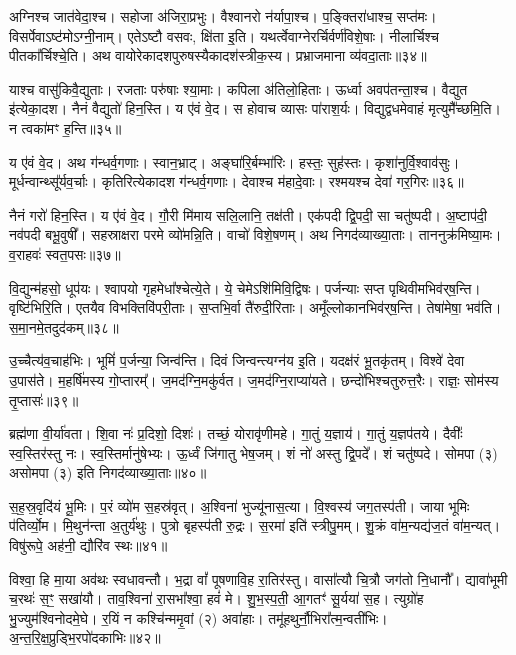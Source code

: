 अग्निश्च जात॑वेदा॒श्च। सहोजा अ॑जिरा॒प्रभुः। वैश्वानरो न॑र्यापा॒श्च। 
प॒ङ्क्तिरा॑धाश्च॒ सप्त॑मः। विसर्पेवाऽष्ट॑मोऽग्नी॒नाम्। 
एतेऽष्टौ वसवः, क्षि॑ता इ॒ति। यथर्त्वेवाग्नेरर्चिर्वर्ण॑विशे॒षाः। 
नीलार्चिश्च पीतका᳚र्चिश्चे॒ति। अथ वायोरेकादशपुरुषस्यैका\-दश॑स्त्रीक॒स्य। 
प्रभ्राजमाना व्य॑वदा॒ताः॥३४॥


याश्च वासु॑किवै॒द्युताः। रजताः परु॑षाः श्या॒माः। कपिला अ॑तिलो॒हिताः। 
ऊर्ध्वा अवप॑तन्ता॒श्च। वैद्युत इ॑त्येका॒दश। नैनं वैद्युतो॑ हिन॒स्ति। 
य ए॑वं वे॒द। स होवाच व्यासः पा॑राश॒र्यः। 
विद्युद्वधमेवाहं मृत्युमै᳚च्छमि॒ति। न त्वका॑मꣳ ह॒न्ति॥३५॥


य ए॑वं वे॒द। अथ ग॑न्धर्व॒गणाः। स्वान॒भ्राट्। 
अङ्घा॑रि॒र्बम्भा॑रिः। हस्तः॒ सुह॑स्तः। कृशा॑नुर्वि॒श्वाव॑सुः। 
मूर्धन्वान्थ्सू᳚र्यव॒र्चाः। कृतिरित्येकादश ग॑न्धर्व॒गणाः। 
देवाश्च म॑हादे॒वाः। रश्मयश्च देवा॑ गर॒गिरः॥३६॥


नैनं गरो॑ हिन॒स्ति। य ए॑वं वे॒द। 
गौ॒री मि॑माय सलि॒लानि॒ तक्ष॑ती। एक॑पदी द्वि॒पदी॒ सा चतु॑ष्पदी। 
अ॒ष्टाप॑दी॒ नव॑पदी बभू॒वुषी᳚। सहस्राक्षरा परमे व्यो॑मन्नि॒ति। 
वाचो॑ विशे॒षणम्। अथ निगद॑व्याख्या॒ताः। 
ताननुक्र॑मिष्या॒मः। व॒राहवः॑ स्वत॒पसः॥३७॥

वि॒द्युन्म॑हसो॒ धूप॑यः। श्वापयो गृहमेधा᳚श्चेत्ये॒ते। 
ये॒ चेमेऽशि॑मिवि॒\-द्विषः। पर्जन्याः सप्त पृथिवीमभिव॑र्‌ष॒न्ति। 
वृष्टि॑भिरि॒ति। एतयैव विभक्तिवि॑परी॒ताः। स॒प्तभि॒र्वा तै॑रुदी॒रिताः। 
अमूँल्लोकान\-भिव॑र्‌ष॒न्ति। तेषा॑मेषा॒ भव॑ति। स॒मा॒नमे॒तदुद॑कम्॥३८॥

उ॒च्चैत्य॑व॒चाह॑भिः। भूमिं॑ प॒र्जन्या॒ जिन्व॑न्ति। दिवं जिन्वन्त्यग्न॑य इ॒ति। 
यदक्ष॑रं भू॒तकृ॑तम्। विश्वे॑ देवा उ॒पास॑ते। म॒हर्\mbox{}षि॑मस्य गो॒प्तारम्᳚। 
ज॒मद॑ग्नि॒मकु॑र्वत। ज॒मद॑ग्नि॒\-राप्या॑यते। 
छन्दो॑भिश्चतुरुत्त॒रैः। राज्ञः॒ सोम॑स्य तृ॒प्तासः॑॥३९॥

ब्रह्म॑णा वी॒र्या॑वता। शि॒वा नः॑ प्र॒दिशो॒ दिशः॑। 
तच्छं॒ योरावृ॑णीमहे। गा॒तुं य॒ज्ञाय॑। गा॒तुं य॒ज्ञप॑तये। 
दैवीः᳚ स्व॒स्तिर॑स्तु नः। स्व॒स्तिर्मानु॑षेभ्यः। ऊ॒र्ध्वं जि॑गातु भेष॒जम्। 
शं नो॑ अस्तु द्वि॒पदे᳚। शं चतु॑ष्पदे। 
सोमपा (३) असोमपा (३) इति निगद॑व्याख्या॒ताः॥४०॥\anuvakamend


स॒ह॒स्र॒वृदि॑यं भू॒मिः। प॒रं व्यो॑म स॒हस्र॑वृत्। अ॒श्विना॑ भुज्यू॑नास॒त्या। 
वि॒श्वस्य॑ जग॒तस्प॑ती। जाया भूमिः प॑तिर्व्यो॒म। मि॒थुन॑न्ता अ॒तुर्य॑थुः। 
पुत्रो बृहस्प॑ती रु॒द्रः। स॒रमा॑ इति॑ स्त्रीपु॒मम्। 
शु॒क्रं वा॑म॒न्यद्य॑ज॒तं वा॑म॒न्यत्। विषु॑रूपे॒ अह॑नी॒ द्यौरि॑व स्थः॥४१॥



विश्वा॒ हि मा॒या अव॑थः स्वधावन्तौ। 
भ॒द्रा वां᳚ पूषणावि॒ह रा॒तिर॑स्तु। वासा᳚त्यौ चि॒त्रौ जग॑तो नि॒धानौ᳚। 
द्यावा॑भूमी च॒रथः॑ स॒ꣳ॒ सखा॑यौ। ताव॒श्विना॑ रा॒सभा᳚श्वा॒ हवं॑ मे। 
शु॒भ॒स्प॒ती॒ आ॒गतꣳ॑ सू॒र्यया॑ स॒ह। त्युग्रो॑ह भु॒ज्युम॑श्विनोदमे॒घे। 
र॒यिं न कश्चि॑न्ममृ॒वां (२) अवा॑हाः। तमू॑हथुर्नौ॒भिरा᳚त्म॒न्वती॑भिः। 
अ॒न्त॒रि॒क्ष॒प्रुड्भि॒रपो॑दकाभिः॥४२॥


